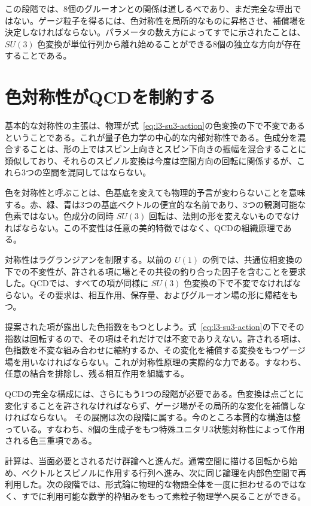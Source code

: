 この段階では、8個のグルーオンとの関係は道しるべであり、まだ完全な導出ではない。ゲージ粒子を得るには、色対称性を局所的なものに昇格させ、補償場を決定しなければならない。パラメータの数え方によってすでに示されたことは、\(SU(3)\) 色変換が単位行列から離れ始めることができる8個の独立な方向が存在することである。

\section{色対称性がQCDを制約する}

基本的な対称性の主張は、物理が式~\eqref{eq:l3-su3-action}の色変換の下で不変であるということである。これが量子色力学の中心的な内部対称性である。色成分を混合することは、形の上ではスピン上向きとスピン下向きの振幅を混合することに類似しており、それらのスピノル変換は今度は空間方向の回転に関係するが、これら3つの空間を混同してはならない。

色を対称性と呼ぶことは、色基底を変えても物理的予言が変わらないことを意味する。赤、緑、青は3つの基底ベクトルの便宜的な名前であり、3つの観測可能な色素ではない。色成分の同時 \(SU(3)\) 回転は、法則の形を変えないものでなければならない。この不変性は任意の美的特徴ではなく、QCDの組織原理である。

対称性はラグランジアンを制限する。以前の \(U(1)\) の例では、共通位相変換の下での不変性が、許される項に場とその共役の釣り合った因子を含むことを要求した。QCDでは、すべての項が同様に \(SU(3)\) 色変換の下で不変でなければならない。その要求は、相互作用、保存量、およびグルーオン場の形に帰結をもつ。

提案された項が露出した色指数をもつとしよう。式~\eqref{eq:l3-su3-action}の下でその指数は回転するので、その項はそれだけでは不変でありえない。許される項は、色指数を不変な組み合わせに縮約するか、その変化を補償する変換をもつゲージ場を用いなければならない。これが対称性原理の実際的な力である。すなわち、任意の結合を排除し、残る相互作用を組織する。

QCDの完全な構成には、さらにもう1つの段階が必要である。色変換は点ごとに変化することを許されなければならず、ゲージ場がその局所的な変化を補償しなければならない。 その展開は次の段階に属する。今のところ本質的な構造は整っている。すなわち、8個の生成子をもつ特殊ユニタリ3状態対称性によって作用される色三重項である。

計算は、当面必要とされるだけ群論へと進んだ。通常空間に描ける回転から始め、ベクトルとスピノルに作用する行列へ進み、次に同じ論理を内部色空間で再利用した。次の段階では、形式論に物理的な物語全体を一度に担わせるのではなく、すでに利用可能な数学的枠組みをもって素粒子物理学へ戻ることができる。
